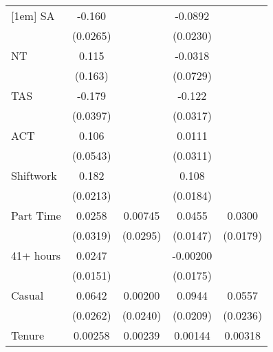 {\begin{tabular}{l*{4}{c}}
[1em]
SA                  &      -0.160\sym{***}&                     &     -0.0892\sym{***}&                     \\
                    &    (0.0265)         &                     &    (0.0230)         &                     \\
[1em]
NT                  &       0.115         &                     &     -0.0318         &                     \\
                    &     (0.163)         &                     &    (0.0729)         &                     \\
[1em]
TAS                 &      -0.179\sym{***}&                     &      -0.122\sym{***}&                     \\
                    &    (0.0397)         &                     &    (0.0317)         &                     \\
[1em]
ACT                 &       0.106         &                     &      0.0111         &                     \\
                    &    (0.0543)         &                     &    (0.0311)         &                     \\
[1em]
Shiftwork           &       0.182\sym{***}&                     &       0.108\sym{***}&                     \\
                    &    (0.0213)         &                     &    (0.0184)         &                     \\
[1em]
Part Time           &      0.0258         &     0.00745         &      0.0455\sym{**} &      0.0300         \\
                    &    (0.0319)         &    (0.0295)         &    (0.0147)         &    (0.0179)         \\
[1em]
41+ hours           &      0.0247         &                     &    -0.00200         &                     \\
                    &    (0.0151)         &                     &    (0.0175)         &                     \\
[1em]
Casual              &      0.0642\sym{*}  &     0.00200         &      0.0944\sym{***}&      0.0557\sym{*}  \\
                    &    (0.0262)         &    (0.0240)         &    (0.0209)         &    (0.0236)         \\
[1em]
Tenure              &     0.00258\sym{*}  &     0.00239\sym{*}  &     0.00144         &     0.00318\sym{**} \\

\end{tabular}}
